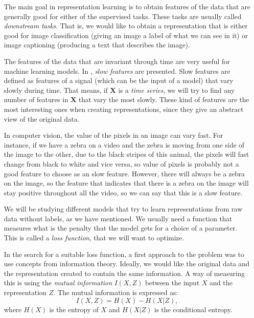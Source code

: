 The main goal in representation learning is to obtain features of the data that are generally good for either of the supervised tasks. These tasks are usually called \emph{downstream tasks}. That is, we would like to obtain
a representation that is either good for image classification (giving an image a label of what we can see in it) or image captioning (producing a text that describes the image).

The features of the data that are invariant through time are very useful for machine learning models. In \citep{wiskott_slow_2002}, \emph{slow features} are presented. Slow features are defined as features of a signal 
(which can be the input of a model) that vary slowly during time. That means, if $\bm{X}$ is a \emph{time series}\footnotemark, we will try to find any number of features in $\bm{X}$ that vary the most slowly.
These kind of features are the most interesting ones when creating representations, since they give an abstract view of the original data.



\begin{nexample} In computer vision, the value of the pixels in an image can vary fast. For instance, if we have a zebra on a video and the zebra is moving from one side of the image to the other, due 
to the black stripes of this animal, the pixels will fast change from black to white and vice versa, so value of pixels is probably not a good feature to choose as an slow feature. However, there will always
be a zebra on the image, so the feature that indicates that there is a zebra on the image will stay positive throughout all the video, so we can say that this is a slow feature.
\end{nexample}

We will be studying different models that try to learn representations from raw data without labels, as we have mentioned. We usually need a function that measures what is the penalty that the model gets for a choice of a parameter.
This is called a \emph{loss function}, that we will want to optimize. 



In the search for a suitable loss function, a first approach to the problem was to use concepts from information theory. Ideally, we would like the original data and the representation created to contain the same information. A way of measuring this is using the \emph{mutual information} $I(X,Z)$ between the input $X$ and the representation $Z$. The mutual information is expressed as:
\[
I(X,Z) = H(X) - H(X|Z),
\]
where $H(X)$ is the entropy of $X$ and $H(X|Z)$ is the conditional entropy.

